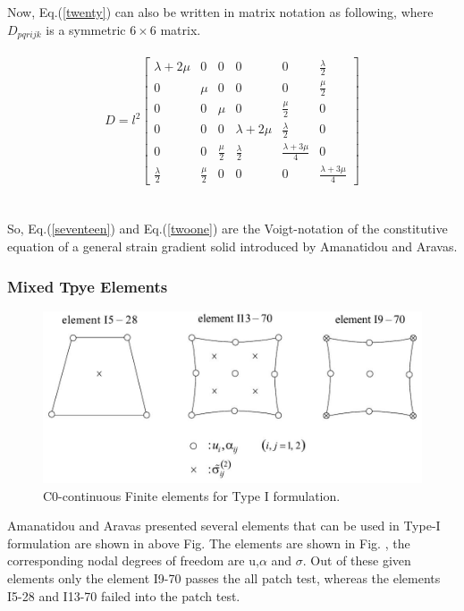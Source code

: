 \documentclass[12pt]{article}
\begin{document}
\\
\\
Now, Eq.(\ref{twenty}) can also be written in matrix notation as following, where $D_{pqrijk}$ is a symmetric $6\times6$ matrix.
\\
\\
\begin{equation}\label{twoone}
D = l^2
\begin{bmatrix}
\lambda + 2\mu & 0 & 0 & 0 & 0 & \frac{\lambda}{2} \\
0 & \mu & 0  & 0  & 0  & \frac{\mu}{2} \\
0 & 0 & \mu & 0  & \frac{\mu}{2}  & 0 \\
0 & 0 & 0 & \lambda + 2\mu & \frac{\lambda}{2} & 0 \\
0 & 0 & \frac{\mu}{2}  & \frac{\lambda}{2} & \frac{\lambda + 3\mu}{4} & 0 \\
 \frac{\lambda}{2} & \frac{\mu}{2} & 0 & 0 & 0 & \frac{\lambda + 3\mu}{4} 
\end{bmatrix}
\end{equation}
\\
\\
So, Eq.(\ref{seventeen}) and Eq.(\ref{twoone}) are the Voigt-notation of the constitutive equation of a general strain gradient solid introduced by Amanatidou and Aravas. 

\newpage
\subsubsection{ Mixed Tpye Elements}
    \begin{figure}[H]
    	\begin{center}
		     \includegraphics[scale=.65]{Element_mixed_type_formulation_E_Amanatidou.JPG}  	
	    \end{center}  
        \caption{C0-continuous Finite elements for Type I formulation.}   
    \end{figure}
Amanatidou and Aravas presented several elements that can be used in Type-I formulation are shown in above Fig. The elements are shown in Fig. , the corresponding nodal degrees of freedom are u,$\alpha$ and $\sigma$. Out of these given elements only the element I9-70 passes the all patch test, whereas the elements I5-28 and I13-70 failed into the patch test.
\\
\end{document}
